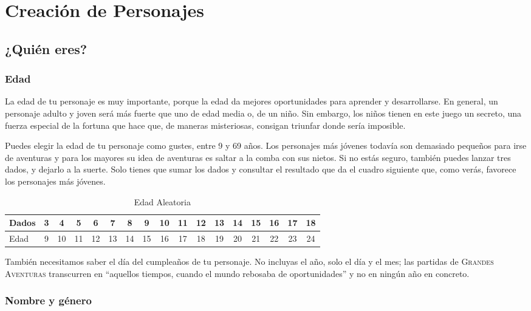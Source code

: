 \chapter{Creación de Personajes}
\varhrulefill

\section{¿Quién eres?}

\subsection{Edad}

La edad de tu personaje es muy importante, porque la edad da mejores oportunidades para aprender y desarrollarse. En general, un personaje adulto y joven será más fuerte que uno de edad media o, de un niño. Sin embargo, los niños tienen en este juego un secreto, una fuerza especial de la fortuna que hace que, de maneras misteriosas, consigan triunfar donde sería imposible. 

Puedes elegir la edad de tu personaje como gustes, entre 9 y 69 años. Los personajes más jóvenes todavía son demasiado pequeños para irse de aventuras y para los mayores su idea de aventuras es saltar a la comba con sus nietos. Si no estás seguro, también puedes lanzar tres dados, y dejarlo a la suerte. Solo tienes que sumar los dados y consultar el resultado que da el cuadro siguiente que, como verás, favorece los personajes más jóvenes.

\begin{table}[h]
\footnotesize
\begin{tabular}{lcccccccccccccccc}
\toprule
Dados&3&4&5&6&7&8&9&10&11&12&13&14&15&16&17&18\\\midrule
Edad&9&10&11&12&13&14&15&16&17&18&19&20&21&22&23&24\\\midrule
\bottomrule
\end{tabular}
\caption{Edad Aleatoria}
\end{table}

También necesitamos saber el día del cumpleaños de tu personaje. No incluyas el año, solo el día y el mes; las partidas de \textsc{Grandes Aventuras} transcurren en \enquote{aquellos tiempos, cuando el mundo rebosaba de oportunidades} y no en ningún año en concreto.

\subsection{Nombre y género}

